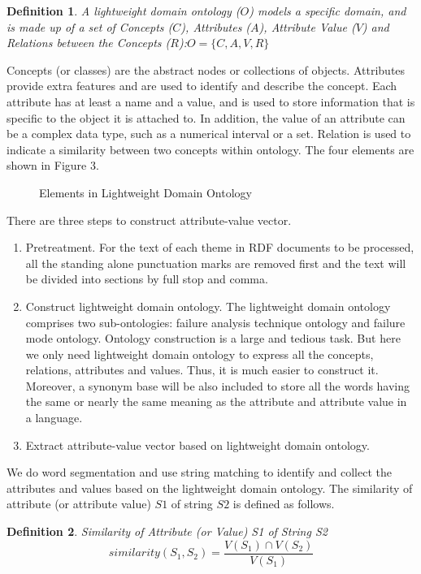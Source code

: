 \documentclass{elsart}
\newtheorem{definition}{Definition}
\begin{document}
\begin{definition}
  A lightweight domain ontology ($O$) models a specific domain, and is
  made up of a set of Concepts ($C$), Attributes ($A$), Attribute
  Value ($V$) and Relations between the Concepts ($R$):$O = \{C,A,V,R\}$


\end{definition}

Concepts (or classes) are the abstract nodes or collections of objects. Attributes provide extra features and are used to identify and describe the concept. Each attribute has at least a name and a value, and is used to store information that is specific to the object it is attached to. In addition, the value of an attribute can be a complex data type, such as a numerical interval or a set. Relation is used to indicate a similarity between two concepts within ontology. The four elements are shown in Figure 3.
\begin{figure}[htb]
  \centering
  \caption{Elements in Lightweight Domain Ontology}
\end{figure}
There are three steps to construct attribute-value vector.
\begin{enumerate}
\item Pretreatment. For the text of each theme in RDF documents to be processed, all the standing alone punctuation marks are removed first and the text will be divided into sections by full stop and comma.
\item  Construct lightweight domain ontology. The lightweight domain ontology comprises two sub-ontologies: failure analysis technique ontology and failure mode ontology. Ontology construction is a large and tedious task. But here we only need lightweight domain ontology to express all the concepts, relations, attributes and values. Thus, it is much easier to construct it. Moreover, a synonym base will be also included to store all the words having the same or nearly the same meaning as the attribute and attribute value in a language. 
\item Extract attribute-value vector based on lightweight domain ontology.

\end{enumerate}

We do word segmentation and use string matching to identify and collect the attributes and values based on the lightweight domain ontology. The similarity of attribute (or attribute value) $S1$ of string $S2$ is defined as follows.
\begin{definition}
  Similarity of Attribute (or Value) S1 of String
  S2 \[similarity(S_1,S_2) = \frac{V(S_1) \cap V(S_2)}{V(S_1)} \]

\end{definition}
\end{document}
